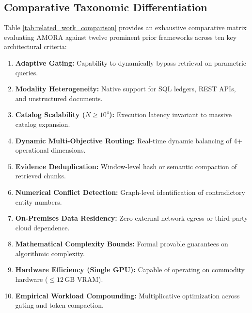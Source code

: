 \subsection{Comparative Taxonomic Differentiation}
Table \ref{tab:related_work_comparison} provides an exhaustive comparative matrix evaluating AMORA against twelve prominent prior frameworks across ten key architectural criteria:
\begin{enumerate}
    \item \textbf{Adaptive Gating:} Capability to dynamically bypass retrieval on parametric queries.
    \item \textbf{Modality Heterogeneity:} Native support for SQL ledgers, REST APIs, and unstructured documents.
    \item \textbf{Catalog Scalability ($N \ge 10^4$):} Execution latency invariant to massive catalog expansion.
    \item \textbf{Dynamic Multi-Objective Routing:} Real-time dynamic balancing of 4+ operational dimensions.
    \item \textbf{Evidence Deduplication:} Window-level hash or semantic compaction of retrieved chunks.
    \item \textbf{Numerical Conflict Detection:} Graph-level identification of contradictory entity numbers.
    \item \textbf{On-Premises Data Residency:} Zero external network egress or third-party cloud dependence.
    \item \textbf{Mathematical Complexity Bounds:} Formal provable guarantees on algorithmic complexity.
    \item \textbf{Hardware Efficiency (Single GPU):} Capable of operating on commodity hardware ($\le 12\,\text{GB}$ VRAM).
    \item \textbf{Empirical Workload Compounding:} Multiplicative optimization across gating and token compaction.
\end{enumerate}

